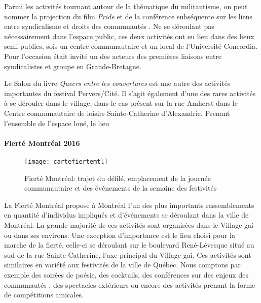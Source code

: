 Parmi les activités tournant autour de la thématique du militantisme, on peut nommer la projection du film \emph{Pride} et de la conférence subséquente sur les liens entre syndicalisme et droits des communautés \lgbt{}.
Ne se déroulant pas nécessairement dans l'espace public, ces deux activités ont eu lieu dans des lieux semi-publics, sois un centre communautaire et un local de l'Université Concordia.
Pour l'occasion était invité un des acteurs des premières liaisons entre syndicalistes et groupe \lgbt{} en Grande-Bretagne.

Le Salon du livre \emph{Queers entre les couvertures} est une autre des activités importantes du festival Pervers/Cité.
Il s'agit également d'une des rares activités à se dérouler dans le village, dans le cas présent sur la rue Amherst dans le Centre communautaire de loisirs Sainte-Catherine d'Alexandrie.
Prenant l'ensemble de l'espace loué, le lieu

\paragraph{Fierté Montréal 2016}
\label{subsec:fiertemontreal2016}

\begin{figure}[ht]
 \centering
 \texttt{[image: cartefiertemtl]}
 \caption[Fierté Montréal: trajet du défilé]{Fierté Montréal: trajet du défilé, emplacement de la journée communautaire et des événements de la semaine des festivités}\label{fig:cartefiertemtl}
\end{figure}

La Fierté Montréal propose à Montréal l'un des plus importants rassemblements \lgbt{} en quantité d'individus impliqués et d'événements se déroulant dans la ville de Montréal.
La grande majorité de ces activités sont organisées dans le Village gai ou dans ses environs.
Une exception d'importance est le lieu choisi pour la marche de la fierté, celle-ci se déroulant sur le boulevard René-Lévesque situé au sud de la rue Sainte-Catherine, l'axe principal du Village gai.
Ces activités sont similaires en variété aux festivités de la ville de Québec.
Nous comptons par exemple des soirées de poésie, des cocktails, des conférences sur des enjeux des communautés \lgbt, des spectacles extérieurs ou encore des activités prenant la forme de compétitions amicales.


